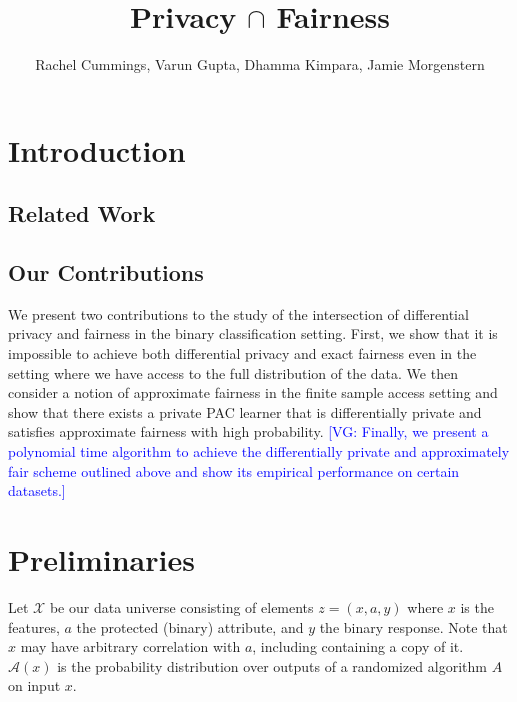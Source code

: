 \documentclass[format = sigconf]{acmart}
\newcommand{\vg}[1]{\textcolor{blue}{[VG: #1]}}
\newcommand{\A}{\mathcal{A}}
\newcommand{\X}{\mathcal{X}}
\newcommand{\1}{\mathbbm{1}}
\theoremstyle{definition}
\begin{document}
\title{Privacy $\cap$ Fairness}
{\author{Rachel Cummings, Varun Gupta, Dhamma Kimpara, Jamie Morgenstern}}
\maketitle


\section{Introduction}


\subsection{Related Work}


\subsection{Our Contributions}
We present two contributions to the study of the intersection of
differential privacy and fairness in the binary classification setting.
First, we show that it is impossible to achieve both differential
privacy and exact fairness even in the setting where we have access to
the full distribution of the data. We then consider a notion of
approximate fairness in the finite sample access setting and show that
there exists a private PAC learner that is differentially private and
satisfies approximate fairness with high probability. \vg{Finally, we
present a polynomial time algorithm to achieve the differentially
private and approximately fair scheme outlined above and show its
empirical performance on certain datasets.}


\section{Preliminaries}
Let $\X$ be our data universe consisting of elements $z=(x,a,y)$
 where $x$ is the features, $a$ the protected (binary) attribute, and
 $y$ the binary response. Note that $x$ may have arbitrary correlation
 with $a$, including containing a copy of it. $\A(x)$ is the
 probability distribution over outputs of a randomized algorithm $A$ on
 input $x$.


\end{document}
